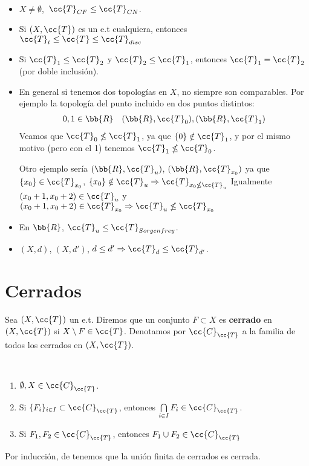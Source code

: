 \begin{ejemplo}\
    \begin{itemize}
        \item $X \neq \emptyset$,\ $\cc{T}_{CF}\leq \cc{T}_{CN}$.
        \item Si $(X,\cc{T})$ es un e.t cualquiera, entonces $\cc{T}_t \leq \cc{T} \leq \cc{T}_{disc}$ 
        \item Si $\cc{T}_1 \leq \cc{T}_2$ y $\cc{T}_2\leq \cc{T}_1$, entonces $\cc{T}_1= \cc{T}_2$ (por doble inclusión).
        \item En general si tenemos dos topologías en $X$, no siempre son comparables. Por ejemplo la topología del punto incluido en dos puntos distintos: 
        \begin{gather*}
            0,1\in \bb{R}\ \ \ (\bb{R}, \cc{T}_0), (\bb{R},\cc{T}_1)
        \end{gather*}
        Veamos que $\cc{T}_0 \nleq \cc{T}_1$, ya que $\{0\}\notin \cc{T}_1$, y por el mismo motivo (pero con el 1) tenemos $\cc{T}_1\nleq \cc{T}_0$.

        Otro ejemplo sería $(\bb{R}, \cc{T}_u)$, $(\bb{R},\cc{T}_{x_0})$ ya que $\{x_0\}\in \cc{T}_{x_0}$, $\{x_0\}\notin \cc{T}_u\Rightarrow \cc{T}_{x_0\nleq \cc{T}_u}$
        Igualmente $(x_0+1,x_0+2)\in \cc{T}_u$ y $(x_0+1,x_0+2)\in \cc{T}_{x_0} \Rightarrow \cc{T}_u \nleq \cc{T}_{x_0}$
        \item En $\bb{R}$, $\cc{T}_u\leq \cc{T}_{Sorgenfrey}$.
        \item $(X,d)$, $(X,d')$, $d \leq d' \Rightarrow \cc{T}_d \leq \cc{T}_{d'}$.
    \end{itemize}
    \endsquare
\end{ejemplo}

\section{Cerrados}

\begin{definicion}
    Sea $(X,\cc{T})$ un e.t. Diremos que un conjunto $F\subset X$ es \textbf{cerrado} en $(X,\cc{T})$ si $X\setminus F \in \cc{T}$. Denotamos por $\cc{C}_{\cc{T}}$ a la familia de todos los cerrados en $(X,\cc{T})$.
    \endsquare
\end{definicion}

\begin{propiedades}\ 
    \begin{enumerate}
        \item[\objetivo{C1}] $\emptyset, X \in \cc{C}_{\cc{T}}$.
        \item[\objetivo{C2}] Si $\{F_i\}_{i\in I}\subset \cc{C}_{\cc{T}}$, entonces $\bigcap\limits_{i\in I}F_i \in \cc{C}_{\cc{T}}$.
        \item[\objetivo{C3}] Si $F_1, F_2 \in \cc{C}_{\cc{T}}$, entonces $F_1 \cup F_2 \in \cc{C}_{\cc{T}}$
    \end{enumerate}
    Por inducción, de \apuntar{C3} tenemos que la unión finita de cerrados es cerrada.\\
\end{propiedades}

